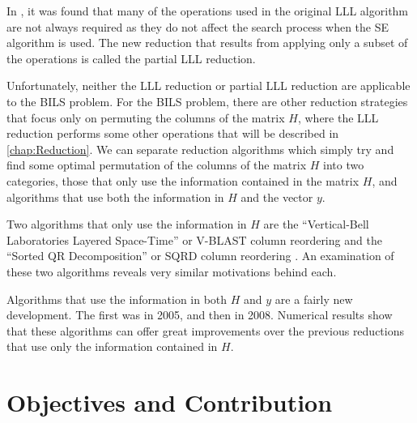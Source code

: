 \documentclass[12pt,Bold,letterpaper]{mcgilletdclass}
\newcommand{\vsp}{\vspace{\baselineskip}}
\begin{document}
In \cite{XieCB11}, it was found that many of the operations used in the original LLL algorithm are not always required as they do not affect the search process when the SE algorithm is used. The new reduction that results from applying only a subset of the operations is called the partial LLL reduction.

Unfortunately, neither the LLL reduction or partial LLL reduction are applicable to the BILS problem. For the BILS problem, there are other reduction strategies that focus only on permuting the columns of the matrix $H$, where the LLL reduction performs some other operations that will be described in \ref{chap:Reduction}. We can separate reduction algorithms which simply try and find some optimal permutation of the columns of the matrix $H$ into two categories, those that only use the information contained in the matrix $H$, and algorithms that use both the information in $H$ and the vector $y$.

Two algorithms that only use the information in $H$ are the ``Vertical-Bell Laboratories Layered Space-Time'' or V-BLAST column reordering \cite{FosGVW99} and the ``Sorted QR Decomposition'' or SQRD column reordering \cite{WubBRKK01}. An examination of these two algorithms reveals very similar motivations behind each.

Algorithms that use the information in both $H$ and $y$ are a fairly new development. The first was \cite{SuW05} in 2005, and then \cite{ChaH05} in 2008. Numerical results show that these algorithms can offer great improvements over the previous reductions that use only the information contained in $H$.

\vsp \section{Objectives and Contribution}
\end{document}
